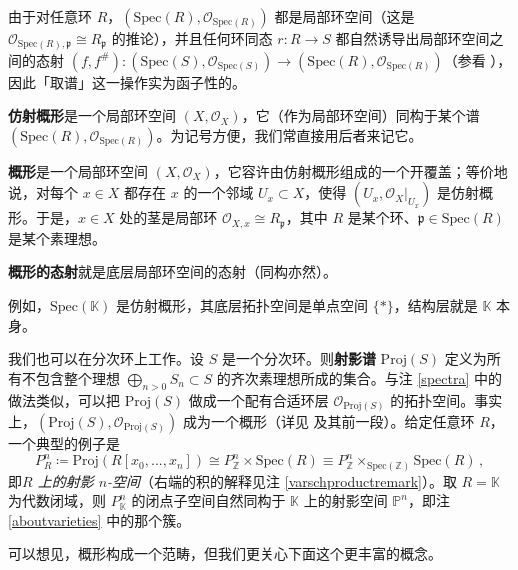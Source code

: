 由于对任意环 $R$，$(\text{Spec}(R),\mathcal{O}_{\text{Spec}(R)})$ 都是局部环空间（这是 $\mathcal{O}_{\text{Spec}(R),\mathfrak{p}}\cong R_\mathfrak{p}$ 的推论），并且任何环同态 $r:R\rightarrow S$ 都自然诱导出局部环空间之间的态射 $(f,f^\#):(\text{Spec}(S),\mathcal{O}_{\text{Spec}(S)})\rightarrow (\text{Spec}(R),\mathcal{O}_{\text{Spec}(R)})$（参看 \cite[命题 II.2.3]{[Har77]}），\break 因此「取谱」这一操作实为函子性的。

\begin{Def}
\textbf{仿射概形}是一个局部环空间 $(X,\mathcal{O}_X)$，它（作为局部环空间）同构于某个谱 $(\text{Spec}(R),\mathcal{O}_{\text{Spec}(R)})$。为记号方便，我们常直接用后者来记它。

\textbf{概形}是一个局部环空间 $(X,\mathcal{O}_X)$，它容许由仿射概形组成的一个开覆盖；等价地说，对每个 $x\in X$ 都存在 $x$ 的一个邻域 $U_x\subset X$，使得 $(U_x,\mathcal{O}_X|_{U_x})$ 是仿射概形。于是，$x\in X$ 处的茎是局部环 $\mathcal{O}_{X,x}\cong R_\mathfrak{p}$，其中 $R$ 是某个环、$\mathfrak{p}\in\text{Spec}(R)$ 是某个素理想。

\textbf{概形的态射}就是底层局部环空间的态射（同构亦然）。
\end{Def} 

例如，$\text{Spec}(\mathbb{K})$ 是仿射概形，其底层拓扑空间是单点空间 $\{*\}$，结构层就是 $\mathbb{K}$ 本身。 

\begin{Rem}\label{projspectra}
我们也可以在分次环上工作。设 $S$ 是一个分次环。则\textbf{射影谱} $\text{Proj}(S)$ 定义为所有不包含整个理想 $\bigoplus_{n>0}S_n\subset S$ 的齐次素理想所成的集合。与注 \ref{spectra} 中的做法类似，可以把 $\text{Proj}(S)$ 做成一个配有合适环层 $\mathcal{O}_{\text{Proj}(S)}$ 的拓扑空间。事实上，$(\text{Proj}(S),\mathcal{O}_{\text{Proj}(S)})$ 成为一个概形（详见 \cite[命题 II.2.5]{[Har77]} 及其前一段）。给定任意环 $R$，一个典型的例子是
\[
P_R^n\coloneqq \text{Proj}(R[x_0,...,x_n])\cong P_\mathbb{Z}^n\times\text{Spec}(R)\equiv P_\mathbb{Z}^n\times_{\text{Spec}(\mathbb{Z})}\text{Spec}(R)\,,
\]
即\textit{$R$ 上的射影 $n$-空间}（右端的积的解释见注 \ref{varschproductremark}）。取 $R=\mathbb{K}$ 为代数闭域，则 $P_\mathbb{K}^n$ 的闭点子空间自然同构于 $\mathbb{K}$ 上的射影空间 $\mathbb{P}^n$，即注 \ref{aboutvarieties} 中的那个簇。
\end{Rem}	

可以想见，概形构成一个范畴，但我们更关心下面这个更丰富的概念。

